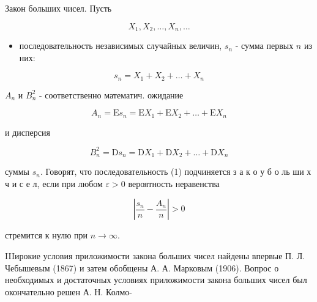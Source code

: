 \documentclass[10pt]{article}
\begin{document}
Закон больших чисел. Пусть



\[

X_{1}, X_{2}, \ldots, X_{n}, \ldots

\]



\begin{itemize}

  \item последовательность независимых случайных величин, $s_{n}$ - сумма первых $n$ из них:

\end{itemize}



\[

s_{n}=X_{1}+X_{2}+\ldots+X_{n}

\]



$A_{n}$ и $B_{n}^{2}$ - соответственно математич. ожидание



\[

A_{n}=\mathrm{E} s_{n}=\mathrm{E} X_{1}+\mathrm{E} X_{2}+\ldots+\mathrm{E} X_{n}

\]



и дисперсия



\[

B_{n}^{2}=\mathrm{D} s_{n}=\mathrm{D} X_{1}+\mathrm{D} X_{2}+\ldots+\mathrm{D} X_{n}

\]



суммы $s_{n}$. Говорят, что последовательность (1) подчиняется з а к о у б о ль ши х ч и с е л, если при любом $\varepsilon>0$ вероятность неравенства



\[

\left|\frac{s_{n}}{n}-\frac{A_{n}}{n}\right|>0

\]



стремится к нулю при $n \rightarrow \infty$.



IIIирокие условия приложимости закона больших чисел найдены впервые П. Л. Чебышевым (1867) и затем обобщены А. А. Марковым (1906). Вопрос о необходимых и достаточных условиях приложимости закона больших чисел был окончательно решен А. Н. Колмо-
\end{document}
